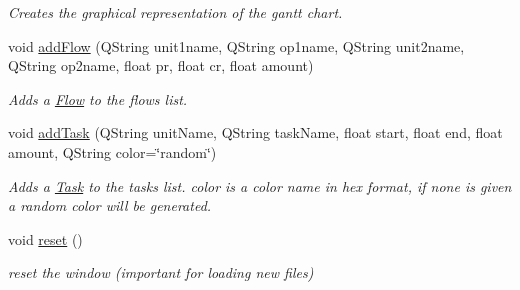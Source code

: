 \begin{DoxyCompactItemize}
\begin{DoxyCompactList}\small\item\em Creates the graphical representation of the gantt chart. \end{DoxyCompactList}\item 
\hypertarget{class_main_window_a645f1cd085c2636dc4eccb320455a6f4}{}void \hyperlink{class_main_window_a645f1cd085c2636dc4eccb320455a6f4}{add\+Flow} (Q\+String unit1name, Q\+String op1name, Q\+String unit2name, Q\+String op2name, float pr, float cr, float amount)\label{class_main_window_a645f1cd085c2636dc4eccb320455a6f4}

\begin{DoxyCompactList}\small\item\em Adds a \hyperlink{struct_flow}{Flow} to the flows list. \end{DoxyCompactList}\item 
\hypertarget{class_main_window_a2920d5c6c64925cb5f87c7fdac3f54b0}{}void \hyperlink{class_main_window_a2920d5c6c64925cb5f87c7fdac3f54b0}{add\+Task} (Q\+String unit\+Name, Q\+String task\+Name, float start, float end, float amount, Q\+String color=\char`\"{}random\char`\"{})\label{class_main_window_a2920d5c6c64925cb5f87c7fdac3f54b0}

\begin{DoxyCompactList}\small\item\em Adds a \hyperlink{struct_task}{Task} to the tasks list. color is a color name in hex format, if none is given a random color will be generated. \end{DoxyCompactList}\item 
\hypertarget{class_main_window_a02076de46e6810174817ebfc6ddd2be5}{}void \hyperlink{class_main_window_a02076de46e6810174817ebfc6ddd2be5}{reset} ()\label{class_main_window_a02076de46e6810174817ebfc6ddd2be5}

\begin{DoxyCompactList}\small\item\em reset the window (important for loading new files) \end{DoxyCompactList}\end{DoxyCompactItemize}
